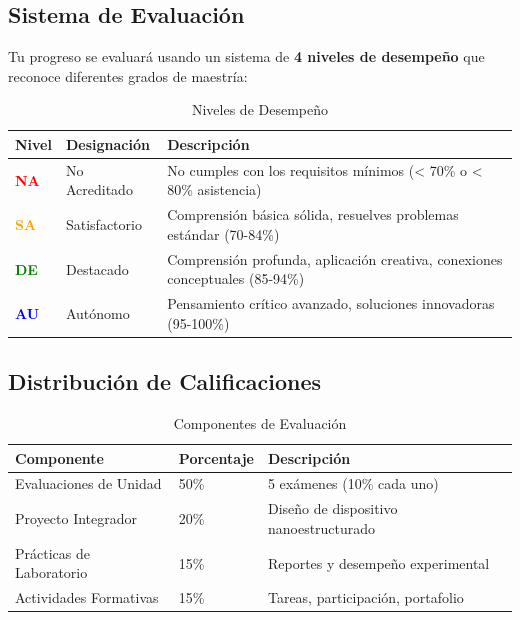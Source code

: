 \begin{tecnologiabox}
\begin{tecnologiabox}
\begin{tecnologiabox}
\begin{teknologiabox}
\begin{tecnologiabox}
\begin{tecnologiabox}
\begin{tecnologiabox}
\begin{tecnologiabox}
\section{Sistema de Evaluación}

Tu progreso se evaluará usando un sistema de \textbf{4 niveles de desempeño} que reconoce diferentes grados de maestría:

\begin{table}[h]
\centering
\caption{Niveles de Desempeño}
\begin{tabular}{|C{2cm}|C{3cm}|L{8cm}|}
	\hline
	\textbf{Nivel} & \textbf{Designación} & \textbf{Descripción} \\
	\hline
	\textcolor{red}{\textbf{NA}} & No Acreditado & No cumples con los requisitos mínimos (< 70\% o < 80\% asistencia) \\
	\hline
	\textcolor{orange}{\textbf{SA}} & Satisfactorio & Comprensión básica sólida, resuelves problemas estándar (70-84\%) \\
	\hline
	\textcolor{green}{\textbf{DE}} & Destacado & Comprensión profunda, aplicación creativa, conexiones conceptuales (85-94\%) \\
	\hline
	\textcolor{blue}{\textbf{AU}} & Autónomo & Pensamiento crítico avanzado, soluciones innovadoras (95-100\%) \\
	\hline
\end{tabular}
\end{table}

\subsection{Distribución de Calificaciones}

\begin{table}[h]
\centering
\caption{Componentes de Evaluación}
\begin{tabular}{|L{5cm}|C{2cm}|L{6cm}|}
	\hline
	\textbf{Componente} & \textbf{Porcentaje} & \textbf{Descripción} \\
	\hline
	Evaluaciones de Unidad & 50\% & 5 exámenes (10\% cada uno) \\
	\hline
	Proyecto Integrador & 20\% & Diseño de dispositivo nanoestructurado \\
	\hline
	Prácticas de Laboratorio & 15\% & Reportes y desempeño experimental \\
	\hline
	Actividades Formativas & 15\% & Tareas, participación, portafolio \\
	\hline
\end{tabular}
\end{table}


\end{tecnologiabox}
\end{tecnologiabox}
\end{tecnologiabox}
\end{tecnologiabox}
\end{teknologiabox}
\end{tecnologiabox}
\end{tecnologiabox}
\end{tecnologiabox}
